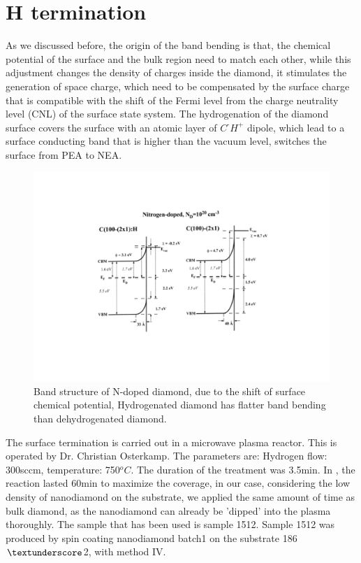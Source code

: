 
\section[H termination]{H termination}
As we discussed before, the origin of the band bending is that, the chemical potential of the surface and the bulk region need to match each other, while this adjustment changes the density of charges inside the diamond, it stimulates the generation of space charge, which need to be compensated by the surface charge that is compatible with the shift of the Fermi level from the charge neutrality level (CNL) of the surface state system. The hydrogenation of the diamond surface covers the surface with an atomic layer of $C^{\text{-}} H^{+}$ dipole, which lead to a surface conducting band that is higher than the vacuum level, switches the surface from PEA to NEA. 



\FloatBarrier
\begin{figure}[h]
\centering
\includegraphics[width=0.7\linewidth]{Figures/pic/Htermination}
\caption{Band structure of N-doped diamond, due to the shift of surface chemical potential, Hydrogenated diamond has flatter band bending than dehydrogenated diamond.\cite{diederich_electron_1998}}
\label{fig:wp20160921210516proli}
\end{figure}
\FloatBarrier

The surface termination is carried out in a microwave plasma reactor. This is operated by Dr. Christian Osterkamp. The parameters are: Hydrogen flow: 300sccm, temperature: 750$^{o}C$. The duration of the treatment was 3.5min. In \cite{yeap_detonation_2009}, the reaction lasted 60min to maximize the coverage, in our case, considering the low density of nanodiamond on the substrate, we applied the same amount of time as bulk diamond, as the nanodiamond can already be 'dipped' into the plasma thoroughly. The sample that has been used is sample 1512. Sample 1512 was produced by spin coating nanodiamond batch1 on the substrate 186$\textunderscore$2, with method IV.

